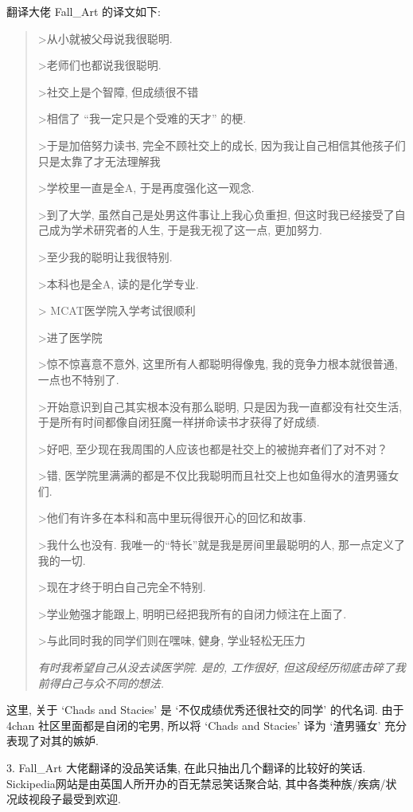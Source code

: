 \documentclass[a4paper, 12pt, UTF8]{article}
\begin{document}
    翻译大佬 Fall\_Art 的译文如下:

\begin{quote}
    >从小就被父母说我很聪明.
    
    >老师们也都说我很聪明.
    
    >社交上是个智障, 但成绩很不错 
    
    >相信了 ``我一定只是个受难的天才'' 的梗. 
    
    >于是加倍努力读书, 完全不顾社交上的成长, 因为我让自己相信其他孩子们只是太靠了才无法理解我
    
    >学校里一直是全A, 于是再度强化这一观念. 
    
    >到了大学, 虽然自己是处男这件事让上我心负重担, 但这时我已经接受了自己成为学术研究者的人生, 于是我无视了这一点, 更加努力. 
    
    >至少我的聪明让我很特别. 
    
    >本科也是全A, 读的是化学专业. 
    
    > MCAT医学院入学考试很顺利
    
    >进了医学院
    
    >惊不惊喜意不意外, 这里所有人都聪明得像鬼, 我的竞争力根本就很普通, 一点也不特别了. 
    
    >开始意识到自己其实根本没有那么聪明, 只是因为我一直都没有社交生活, 于是所有时间都像自闭狂魔一样拼命读书才获得了好成绩.
    
    >好吧, 至少现在我周围的人应该也都是社交上的被抛弃者们了对不对？
    
    >错, 医学院里满满的都是不仅比我聪明而且社交上也如鱼得水的渣男骚女们. 
    
    >他们有许多在本科和高中里玩得很开心的回忆和故事. 
    
    >我什么也没有. 我唯一的“特长”就是我是房间里最聪明的人, 那一点定义了我的一切.
    
    >现在才终于明白自己完全不特别.
    
    >学业勉强才能跟上, 明明已经把我所有的自闭力倾注在上面了.
    
    >与此同时我的同学们则在嘿味, 健身, 学业轻松无压力
    
    \emph{有时我希望自己从没去读医学院. 是的, 工作很好, 但这段经历彻底击碎了我前得白己与众不同的想法.}
\end{quote}

这里, 关于 `Chads and Stacies' 是 `不仅成绩优秀还很社交的同学' 的代名词. 由于 4chan 社区里面都是自闭的宅男, 所以将 `Chads and Stacies' 译为 `渣男骚女' 充分表现了对其的嫉妒.

3. Fall\_Art 大佬翻译的没品笑话集, 在此只抽出几个翻译的比较好的笑话. Sickipedia网站是由英国人所开办的百无禁忌笑话聚合站, 其中各类种族/疾病/状况歧视段子最受到欢迎.
\end{document}
